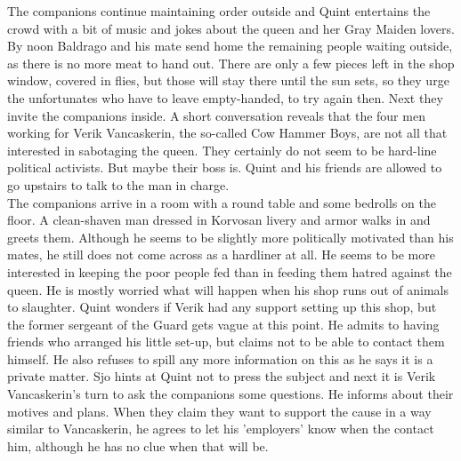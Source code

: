 The companions continue maintaining order outside and Quint entertains the crowd with a bit of music and jokes about the queen and her Gray Maiden lovers. By noon Baldrago and his mate send home the remaining people waiting outside, as there is no more meat to hand out. There are only a few pieces left in the shop window, covered in flies, but those will stay there until the sun sets, so they urge the unfortunates who have to leave empty-handed, to try again then. Next they invite the companions inside. A short conversation reveals that the four men working for Verik Vancaskerin, the so-called Cow Hammer Boys, are not all that interested in sabotaging the queen. They certainly do not seem to be hard-line political activists. But maybe their boss is. Quint and his friends are allowed to go upstairs to talk to the man in charge.\\

The companions arrive in a room with a round table and some bedrolls on the floor. A clean-shaven man dressed in Korvosan livery and armor walks in and greets them. Although he seems to be slightly more politically motivated than his mates, he still does not come across as a hardliner at all. He seems to be more interested in keeping the poor people fed than in feeding them hatred against the queen. He is mostly worried what will happen when his shop runs out of animals to slaughter. Quint wonders if Verik had any support setting up this shop, but the former sergeant of the Guard gets vague at this point. He admits to having friends who arranged his little set-up, but claims not to be able to contact them himself. He also refuses to spill any more information on this as he says it is a private matter. Sjo hints at Quint not to press the subject and next it is Verik Vancaskerin's turn to ask the companions some questions. He informs about their motives and plans. When they claim they want to support the cause in a way similar to Vancaskerin, he agrees to let his 'employers' know when the contact him, although he has no clue when that will be.\\

